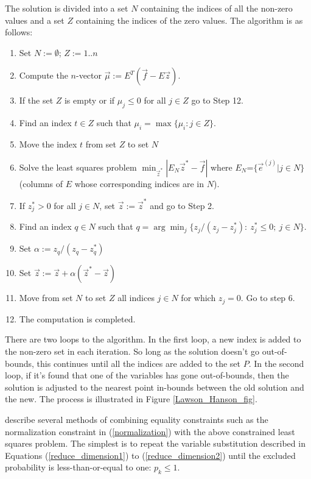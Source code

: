The solution is divided into a set $N$ containing the indices of 
all the non-zero values and a set $Z$ containing the indices of the 
zero values.
The algorithm is as follows:
\begin{enumerate}
	\item Set $N := \emptyset$; $Z:=1..n$
	\item Compute the $n$-vector $\vec \mu := E^T(\vec f - E \vec z)$.
	\item If the set $Z$ is empty or if $\mu_j \le 0$ for all $j \in Z$ go to Step 12.
	\item Find an index $t \in Z$ such that $\mu_i = \max \lbrace \mu_i: j \in Z \rbrace$.
	\item Move the index $t$ from set $Z$ to set $N$
	\item Solve the least squares problem $\min_{\vec z^*} | E_N \vec z^* - \vec f |$ where $E_N$=$\lbrace \vec e^{(j)} | j \in N \rbrace$ (columns of $E$ whose corresponding indices are in $N$).
	\item If $z_j^* > 0$ for all $j \in N$, set $\vec z:= \vec z^*$ and go to Step 2.
	\item Find an index $q \in N$ such that $q = \arg \min_j \lbrace z_j/(z_j - z_j^*): ~z_j^* \le 0;~ j \in N \rbrace$.
	\item Set $\alpha := z_q/(z_q - z_q^*)$
	\item Set $\vec z := \vec z + \alpha(\vec z^* - \vec z)$
	\item Move from set $N$ to set $Z$ all indices $j \in N$ for which $z_j = 0$. Go to step 6.
	\item The computation is completed.
\end{enumerate}

There are two loops to the algorithm. In the first loop, a new index is added
to the non-zero set in each iteration.
So long as the solution doesn't go out-of-bounds, this continues until all
the indices are added to the set $P$.
In the second loop, if it's found that one of the variables has gone out-of-bounds,
then the solution is adjusted to the nearest point in-bounds between the old solution
and the new.
The process is illustrated in Figure \ref{Lawson_Hanson_fig}.

\citet{Lawson_Hanson1995} describe several methods of combining
equality constraints such as the normalization constraint
in (\ref{normalization}) with the above constrained
least squares problem.
The simplest is to repeat the variable substitution
described in Equations (\ref{reduce_dimension1}) to (\ref{reduce_dimension2}) until the excluded
probability is less-than-or-equal to one: $p_k\le 1$.



